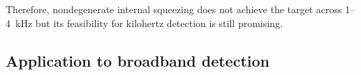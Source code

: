 Therefore, nondegenerate internal squeezing does not achieve the target across 1--4~kHz but its feasibility for kilohertz detection is still promising.


\subsection{Application to broadband detection}


